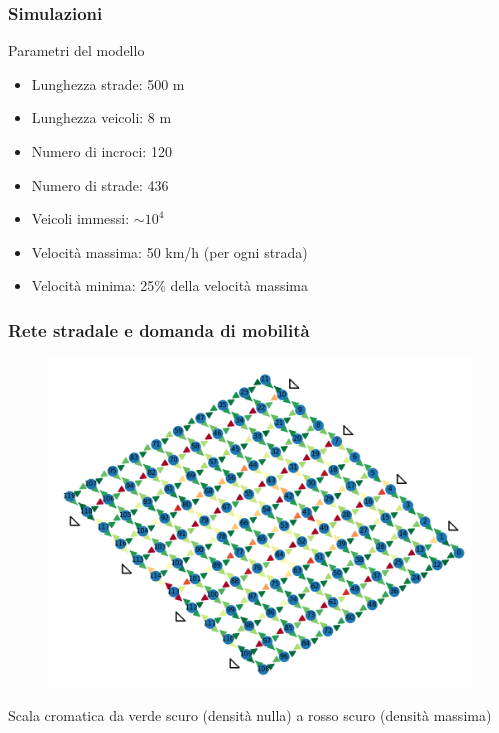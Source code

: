 \documentclass[
	11pt, %
]{beamer}
\begin{document}
\begin{frame}
	\frametitle{Simulazioni} %
	
		\begin{block}{Parametri del modello}
			\begin{itemize}
				\item Lunghezza strade: 500 m
				\item Lunghezza veicoli: 8 m
				\item Numero di incroci: 120
				\item Numero di strade: 436
				\item Veicoli immessi: $\sim 10^4$
				\item Velocit\`a massima: 50 km/h (per ogni strada)
				\item Velocit\`a minima: 25\% della velocit\`a massima
			\end{itemize}
			
		\end{block}	
\end{frame}

\begin{frame}
	\frametitle{Rete stradale e domanda di mobilit\`a} %
	\centering
	\begin{figure}
		\includegraphics[width=.75\textwidth]{example.png}
	\end{figure}
	\scriptsize
	Scala cromatica da verde scuro (densit\`a nulla) a rosso scuro (densit\`a massima)
\end{frame}
\end{document}
